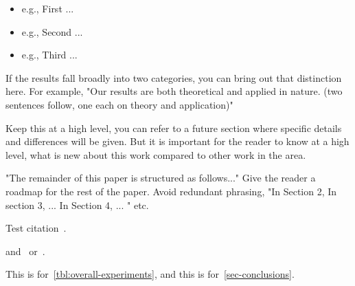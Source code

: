 {}

\begin{itemize}
	\item e.g., First ...
	\item e.g., Second ...
	\item e.g., Third ...
\end{itemize}
If the results fall broadly into two categories, 
you can bring out that distinction here. 
For example, "Our results are both theoretical and applied in nature. 
(two sentences follow, one each on theory and application)"

{}
Keep this at a high level, 
you can refer to a future section where specific details and differences will be given. 
But it is important for the reader to know at a high level, 
what is new about this work compared to other work in the area.

{}
"The remainder of this paper is structured as follows..." 
Give the reader a roadmap for the rest of the paper. 
Avoid redundant phrasing, 
"In Section 2, In section 3, ... In Section 4, ... " etc.




Test citation~\cite{BL12J01}. 
\begin{JournalOnly}
and~\citep{BJL11J01} or~\citet{BJL11J01}.
\end{JournalOnly}

This is for~\cref{tbl:overall-experiments}, 
and this is for~\cref{sec-conclusions}.
%

